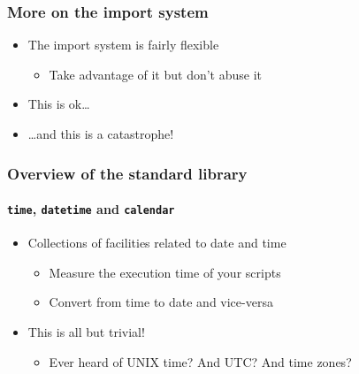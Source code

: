 \documentclass[9pt]{beamer}
\begin{document}
\begin{frame}
  \frametitle{More on the import system}
  \begin{itemize}
  \item The import system is fairly flexible
    \begin{itemize}
    \item Take advantage of it but don't abuse it
    \end{itemize}
  \item This is ok\ldots
  \end{itemize}

  \medskip
  

  \begin{itemize}
  \item \ldots and this is a catastrophe!
  \end{itemize}

  \medskip
  
\end{frame}


\begin{frame}
  \frametitle{Overview of the standard library}
  \framesubtitle{\texttt{time}, \texttt{datetime} and \texttt{calendar}}
  \begin{itemize}
  \item Collections of facilities related to date and time
    \begin{itemize}
    \item Measure the execution time of your scripts
    \item Convert from time to date and vice-versa
    \end{itemize}
  \item This is all but trivial!
    \begin{itemize}
    \item Ever heard of UNIX time? And UTC? And time zones?
    \end{itemize}
  \end{itemize}
\end{frame}
\end{document}
